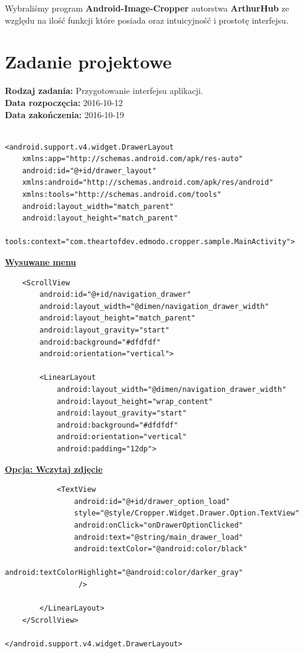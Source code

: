 Wybraliśmy program \textbf{Android-Image-Cropper} autorstwa \textbf{ArthurHub} ze względu na ilość funkcji które posiada oraz intuicyjność i prostotę interfejsu.

\section{Zadanie projektowe}
\noindent\textbf{Rodzaj zadania:}  Przygotowanie interfejsu aplikacji.\\

\noindent\textbf{Data rozpoczęcia:} 2016-10-12\\

\noindent\textbf{Data zakończenia:} 2016-10-19\\
\\


\begin{verbatim}
<android.support.v4.widget.DrawerLayout
    xmlns:app="http://schemas.android.com/apk/res-auto"
    android:id="@+id/drawer_layout"
    xmlns:android="http://schemas.android.com/apk/res/android"
    xmlns:tools="http://schemas.android.com/tools"
    android:layout_width="match_parent"
    android:layout_height="match_parent"
    tools:context="com.theartofdev.edmodo.cropper.sample.MainActivity">
    \end{verbatim}
    \begin{center}
    \centering\underline{\textbf{Wysuwane menu}}
    \end{center}
    \begin{verbatim}
    <ScrollView
        android:id="@+id/navigation_drawer"
        android:layout_width="@dimen/navigation_drawer_width"
        android:layout_height="match_parent"
        android:layout_gravity="start"
        android:background="#dfdfdf"
        android:orientation="vertical">

        <LinearLayout
            android:layout_width="@dimen/navigation_drawer_width"
            android:layout_height="wrap_content"
            android:layout_gravity="start"
            android:background="#dfdfdf"
            android:orientation="vertical"
            android:padding="12dp">
\end{verbatim}
\begin{center}
\underline{\textbf{Opcja: Wczytaj zdjęcie}}
\end{center}
\begin{verbatim}
            <TextView
                android:id="@+id/drawer_option_load"
                style="@style/Cropper.Widget.Drawer.Option.TextView"
                android:onClick="onDrawerOptionClicked"
                android:text="@string/main_drawer_load"
                android:textColor="@android:color/black"
                android:textColorHighlight="@android:color/darker_gray"
                 />

        </LinearLayout>
    </ScrollView>

</android.support.v4.widget.DrawerLayout>

\end{verbatim}

